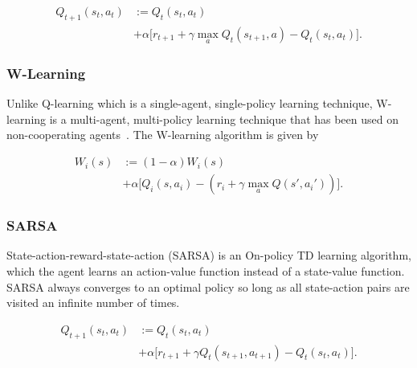 \documentclass[journal]{IEEEtran}
\begin{document}

\begin{equation}\label{eqn1}
\begin{split}
Q_{t + 1}(s_t, a_t) &:= Q_{t}(s_t, a_t)\\
& + \alpha \Big[ r_{t + 1} + \gamma \max_{a}  Q_{t}(s_{t + 1}, a) -  Q_{t}(s_t, a_t) \Big].
   \end{split}
\end{equation}



\subsubsection{W-Learning}
Unlike Q-learning which is a single-agent, single-policy learning technique, W-learning is a multi-agent, multi-policy learning technique that has been used on non-cooperating agents~\cite{Dusparic2009}. The W-learning algorithm is given by

\begin{equation}\label{eqn2}
\begin{split}
W_{i}(s) &:= (1 - \alpha)W_{i}(s) \\
& + \alpha \Big[ Q_{i}(s, a_i)  - (r_i + \gamma \max_{a}  Q(s', a_i')) \Big].
   \end{split}
\end{equation}


\subsubsection{SARSA}
State-action-reward-state-action (SARSA) is an On-policy TD learning algorithm, which the agent learns an action-value function instead of a state-value function. SARSA always converges to an optimal policy so long as all state-action pairs are visited an infinite number of times.

\begin{equation}\label{eqn3}
\begin{split}
Q_{t + 1}(s_t, a_t) &:= Q_{t}(s_t, a_t)\\
& + \alpha \Big[ r_{t + 1} + \gamma Q_{t}(s_{t + 1}, a_{t + 1}) -  Q_{t}(s_t, a_t) \Big].
   \end{split}
\end{equation}
\end{document}
